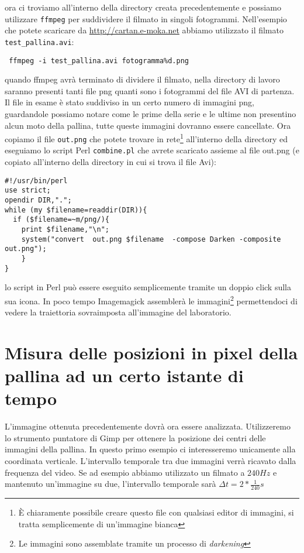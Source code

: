 \documentclass[a4paper,10pt,oneside]{article}
\begin{document}
ora ci troviamo all'interno della directory creata precedentemente e possiamo utilizzare \verb#ffmpeg# per suddividere il filmato in singoli fotogrammi.
Nell'esempio che potete scaricare da \url{http://cartan.e-moka.net} abbiamo utilizzato il filmato \verb#test_pallina.avi#:
\begin{verbatim}
 ffmpeg -i test_pallina.avi fotogramma%d.png
\end{verbatim}
quando ffmpeg avrà terminato di dividere il filmato, nella directory di lavoro saranno presenti tanti file png quanti sono i fotogrammi del file AVI di partenza. Il file in esame è stato suddiviso in un certo numero di immagini png, guardandole possiamo notare come le prime della serie e le ultime non presentino alcun moto della pallina, tutte queste immagini dovranno essere cancellate.
Ora copiamo il file \verb#out.png# che potete trovare in rete\footnote{È chiaramente possibile creare questo file con qualsiasi editor di immagini, si tratta semplicemente di un'immagine bianca} all'interno della directory ed eseguiamo lo script Perl \verb#combine.pl# che avrete scaricato assieme al file out.png (e copiato all'interno della directory in cui si trova il file Avi):
\begin{verbatim}
#!/usr/bin/perl
use strict;
opendir DIR,".";
while (my $filename=readdir(DIR)){
  if ($filename=~m/png/){
    print $filename,"\n";
    system("convert  out.png $filename  -compose Darken -composite out.png");
	}
}
\end{verbatim}
lo script in Perl può essere eseguito semplicemente tramite un doppio click sulla sua icona.
In poco tempo Imagemagick assemblerà le immagini\footnote{Le immagini sono assemblate tramite un processo di \textsl{darkening}} permettendoci di vedere la traiettoria sovraimposta all'immagine del laboratorio.

\section{Misura delle posizioni in pixel della pallina ad un certo istante di tempo}

L'immagine ottenuta precedentemente dovrà ora essere analizzata. Utilizzeremo lo strumento puntatore di Gimp per ottenere la posizione dei centri delle immagini della pallina. In questo primo esempio ci interesseremo unicamente alla coordinata verticale. L'intervallo temporale tra due immagini verrà ricavato dalla frequenza del video. Se ad esempio abbiamo utilizzato un filmato a  $240Hz$ e mantenuto un'immagine su due, l'intervallo temporale sarà $\Delta t=2*\frac{1}{240}s$
\end{document}
